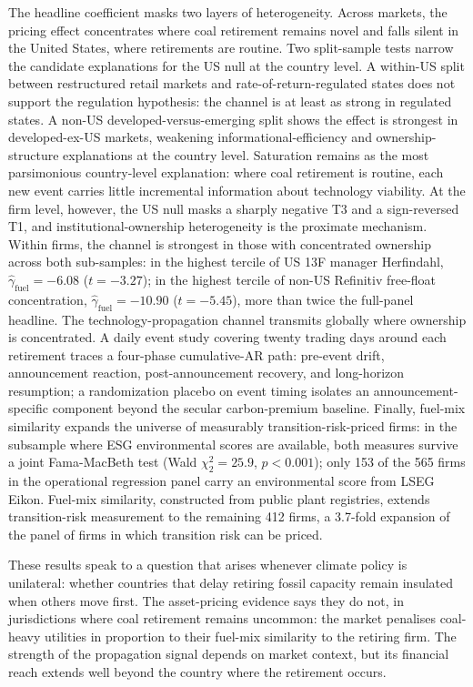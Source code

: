 \documentclass[12pt,a4paper]{article}
\begin{document}
The headline coefficient masks two layers of heterogeneity. Across markets, the pricing effect concentrates where coal retirement remains novel and falls silent in the United States, where retirements are routine. Two split-sample tests narrow the candidate explanations for the US null at the country level. A within-US split between restructured retail markets and rate-of-return-regulated states does not support the regulation hypothesis: the channel is at least as strong in regulated states. A non-US developed-versus-emerging split shows the effect is strongest in developed-ex-US markets, weakening informational-efficiency and ownership-structure explanations at the country level. Saturation remains as the most parsimonious country-level explanation: where coal retirement is routine, each new event carries little incremental information about technology viability. At the firm level, however, the US null masks a sharply negative T3 and a sign-reversed T1, and institutional-ownership heterogeneity is the proximate mechanism. Within firms, the channel is strongest in those with concentrated ownership across both sub-samples: in the highest tercile of US 13F manager Herfindahl, $\hat\gamma_{\mathrm{fuel}} = -6.08$ ($t = -3.27$); in the highest tercile of non-US Refinitiv free-float concentration, $\hat\gamma_{\mathrm{fuel}} = -10.90$ ($t = -5.45$), more than twice the full-panel headline. The technology-propagation channel transmits globally where ownership is concentrated. A daily event study covering twenty trading days around each retirement traces a four-phase cumulative-AR path: pre-event drift, announcement reaction, post-announcement recovery, and long-horizon resumption; a randomization placebo on event timing isolates an announcement-specific component beyond the secular carbon-premium baseline. Finally, fuel-mix similarity expands the universe of measurably transition-risk-priced firms: in the subsample where ESG environmental scores are available, both measures survive a joint Fama-MacBeth test (Wald $\chi^2_2 = 25.9$, $p < 0.001$); only 153 of the 565 firms in the operational regression panel carry an environmental score from LSEG Eikon. Fuel-mix similarity, constructed from public plant registries, extends transition-risk measurement to the remaining 412 firms, a 3.7-fold expansion of the panel of firms in which transition risk can be priced.

These results speak to a question that arises whenever climate policy is unilateral: whether countries that delay retiring fossil capacity remain insulated when others move first. The asset-pricing evidence says they do not, in jurisdictions where coal retirement remains uncommon: the market penalises coal-heavy utilities in proportion to their fuel-mix similarity to the retiring firm. The strength of the propagation signal depends on market context, but its financial reach extends well beyond the country where the retirement occurs.
\end{document}
